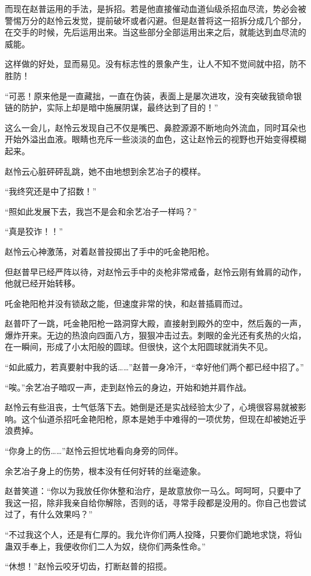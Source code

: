 \begin{this_body}
而现在赵普运用的手法，是拆招。若是他直接催动血道仙级杀招血尽流，势必会被警惕万分的赵怜云发觉，提前破坏或者闪避。但是赵普将这一招拆分成几个部分，在交手的时候，先后运用出来。当这些部分全部运用出来之后，就能达到血尽流的威能。

这样做的好处，显而易见。没有标志性的景象产生，让人不知不觉间就中招，防不胜防！

“可恶！原来他是一直藏拙，一直在伪装，表面上是屡次进攻，没有突破我锁命银链的防护，实际上却是暗中施展阴谋，最终达到了目的！”

这么一会儿，赵怜云发现自己不仅是嘴巴、鼻腔源源不断地向外流血，同时耳朵也开始外溢出血液。眼睛也充斥一些淡淡的血色，这让赵怜云的视野也开始变得模糊起来。

赵怜云心脏砰砰乱跳，她不由地想到余艺冶子的模样。

“我终究还是中了招数！”

“照如此发展下去，我岂不是会和余艺冶子一样吗？”

“真是狡诈！！”

赵怜云心神激荡，对着赵普投掷出了手中的吒金艳阳枪。

但赵普早已经严阵以待，对赵怜云手中的炎枪非常戒备，赵怜云刚有耸肩的动作，他就已经开始转移。

吒金艳阳枪并没有锁敌之能，但速度非常的快，和赵普插肩而过。

赵普吓了一跳，吒金艳阳枪一路洞穿大殿，直接射到殿外的空中，然后轰的一声，爆炸开来。无边的热浪向四面八方，狠狠冲击过去。刺眼的金光还有炙热的火焰，在一瞬间，形成了小太阳般的圆球。但很快，这个太阳圆球就消失不见。

“如此威力，若真要射中我的话……”赵普一身冷汗，“幸好他们两个都已经中招了。”

“唉。”余艺冶子暗叹一声，走到赵怜云的身边，开始和她并肩作战。

赵怜云有些沮丧，士气低落下去。她倒是还是实战经验太少了，心境很容易就被影响。这个仙道杀招吒金艳阳枪，原本是她手中难得的一项优势，但现在却被她近乎浪费掉。

“你身上的伤……”赵怜云担忧地看向身旁的同伴。

余艺冶子身上的伤势，根本没有任何好转的丝毫迹象。

赵普笑道：“你以为我放任你休整和治疗，是故意放你一马么。呵呵呵，只要中了我这一招，除非我亲自给你解除，否则的话，寻常手段都是没用的。你自己也尝试过了，有什么效果吗？”

“不过我这个人，还是有仁厚的。我允许你们两人投降，只要你们跪地求饶，将仙蛊双手奉上，我便收你们二人为奴，绕你们两条性命。”

“休想！”赵怜云咬牙切齿，打断赵普的招揽。


\end{this_body}
